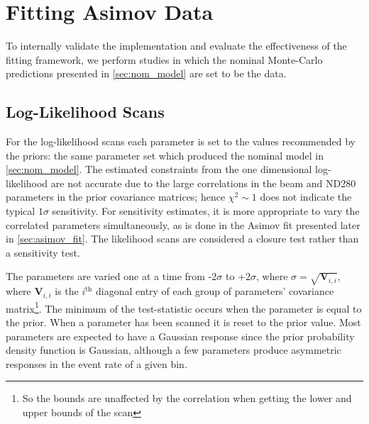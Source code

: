 \section{Fitting Asimov Data}
\label{sec:asimov}
To internally validate the implementation and evaluate the effectiveness of the fitting framework, we perform studies in which the nominal Monte-Carlo predictions presented in \autoref{sec:nom_model} are set to be the data.

\subsection{Log-Likelihood Scans}
\label{sec:llh_scan}
For the log-likelihood scans each parameter is set to the values recommended by the priors: the same parameter set which produced the nominal model in \autoref{sec:nom_model}. The estimated constraints from the one dimensional log-likelihood are not accurate due to the large correlations in the beam and ND280 parameters in the prior covariance matrices; hence $\chi^2\sim1$ does not indicate the typical $1\sigma$ sensitivity. For sensitivity estimates, it is more appropriate to vary the correlated parameters simultaneously, as is done in the Asimov fit presented later in \autoref{sec:asimov_fit}. The likelihood scans are considered a closure test rather than a sensitivity test.

The parameters are varied one at a time from -2$\sigma$ to +2$\sigma$, where $\sigma = \sqrt{\mathbf{V}_{i,i}}$, where $\mathbf{V}_{i,i}$ is the $i^{\text{th}}$ diagonal entry of each group of parameters' covariance matrix\footnote{So the bounds are unaffected by the correlation when getting the lower and upper bounds of the scan}. The minimum of the test-statistic occurs when the parameter is equal to the prior. When a parameter has been scanned it is reset to the prior value. Most parameters are expected to have a Gaussian response since the prior probability density function is Gaussian, although a few parameters produce asymmetric responses in the event rate of a given bin.

